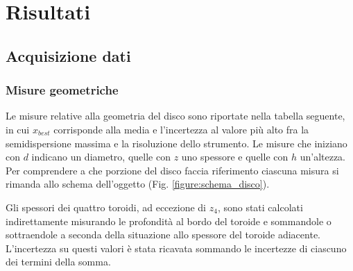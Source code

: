 \documentclass{article}
\begin{document}
\section{Risultati}

\subsection{Acquisizione dati}
\subsubsection{Misure geometriche}
Le misure relative alla geometria del disco sono riportate nella tabella seguente, in cui $x_{best}$ corrisponde alla media e l'incertezza al valore più alto fra la semidispersione massima e la risoluzione dello strumento. Le misure che iniziano con $d$ indicano un diametro, quelle con $z$ uno spessore e quelle con $h$ un'altezza. Per comprendere a che porzione del disco faccia riferimento ciascuna misura si rimanda allo schema dell'oggetto (Fig. \ref{figure:schema_disco}).

Gli spessori dei quattro toroidi, ad eccezione di $z_4$, sono stati calcolati indirettamente misurando le profondità al bordo del toroide  e sommandole o sottraendole a seconda della situazione allo spessore del toroide adiacente. L'incertezza su questi valori è stata ricavata sommando le incertezze di ciascuno dei termini della somma.
\end{document}

